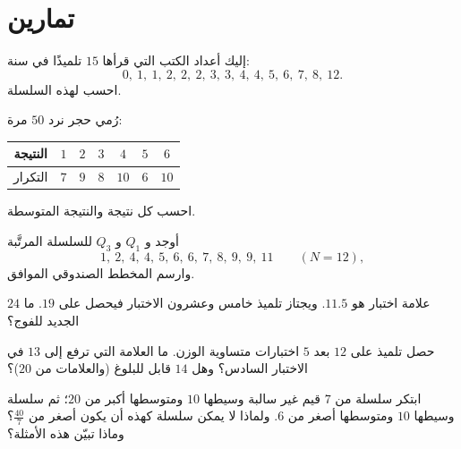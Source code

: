 \section{تمارين}

\begin{exercise}[$\star$]\label{exo:g10:stats:1}
إليك أعداد الكتب التي قرأها $15$ تلميذًا في سنة:
\[
0,\ 1,\ 1,\ 2,\ 2,\ 2,\ 3,\ 3,\ 4,\ 4,\ 5,\ 6,\ 7,\ 8,\ 12 .
\]
احسب    لهذه السلسلة.
\end{exercise}

\begin{exercise}[$\star$]\label{exo:g10:stats:2}
رُمي حجر نرد $50$ مرة:
\begin{center}
\renewcommand{\arraystretch}{1.2}
\begin{tabular}{c|cccccc}
النتيجة & $1$ & $2$ & $3$ & $4$ & $5$ & $6$ \\
\hline
التكرار & $7$ & $9$ & $8$ & $10$ & $6$ & $10$ \\
\end{tabular}
\end{center}
احسب  كل نتيجة والنتيجة المتوسطة.
\end{exercise}

\begin{exercise}[$\star$]\label{exo:g10:stats:3}
أوجد  و $Q_1$ و $Q_3$ للسلسلة المرتَّبة
\[
1,\ 2,\ 4,\ 4,\ 5,\ 6,\ 6,\ 7,\ 8,\ 9,\ 9,\ 11 \qquad (N = 12),
\]
وارسم المخطط الصندوقي الموافق.
\end{exercise}

\begin{exercise}[$\star$]\label{exo:g10:stats:4}
 $24$ علامة اختبار هو $11.5$. ويجتاز تلميذ خامس وعشرون الاختبار
فيحصل على $19$. ما  الجديد للفوج؟
\end{exercise}

\begin{exercise}[$\star\star$]\label{exo:g10:stats:5}
حصل تلميذ على  $12$ بعد $5$ اختبارات متساوية الوزن.
ما العلامة التي ترفع  إلى $13$ في الاختبار السادس؟ وهل 
$14$ قابل للبلوغ (والعلامات من $20$)؟
\end{exercise}

\begin{exercise}[$\star\star$]\label{exo:g10:stats:6}
ابتكر سلسلة من $7$ قيم غير سالبة وسيطها $10$ ومتوسطها
أكبر من $20$؛ ثم سلسلة وسيطها $10$ ومتوسطها
أصغر من $6$. ولماذا لا يمكن  سلسلة كهذه أن يكون أصغر من
$\frac{40}{7}$؟ وماذا تبيّن هذه الأمثلة؟
\end{exercise}

